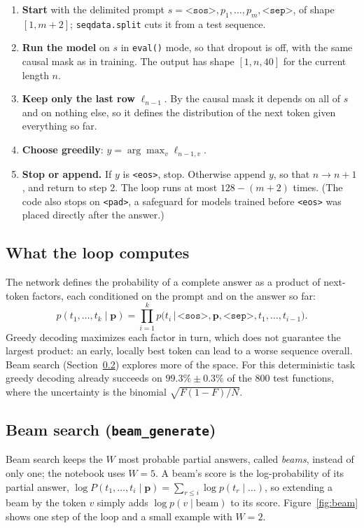 \documentclass[11pt]{article}
\newcommand{\tok}[1]{\texttt{<#1>}}
\newcommand{\code}[1]{\texttt{#1}}
\begin{document}
\begin{enumerate}
\item \textbf{Start} with the delimited prompt $s=\tok{sos},p_1,\dots,p_m,\tok{sep}$, of
  shape $[1,m+2]$; \code{seqdata.split} cuts it from a test sequence.
\item \textbf{Run the model} on $s$ in \code{eval()} mode, so that dropout is off, with
  the same causal mask as in training. The output has shape $[1,n,40]$ for the current
  length $n$.
\item \textbf{Keep only the last row} $\ell_{n-1}$. By the causal mask it depends on all
  of $s$ and on nothing else, so it defines the distribution of the next token given
  everything so far.
\item \textbf{Choose greedily}: $y=\arg\max_v\ell_{n-1,v}$.
\item \textbf{Stop or append.} If $y$ is \tok{eos}, stop. Otherwise append $y$, so that
  $n\to n+1$, and return to step 2. The loop runs at most $128-(m+2)$ times. (The code
  also stops on \tok{pad}, a safeguard for models trained before \tok{eos} was placed
  directly after the answer.)
\end{enumerate}

\subsection{What the loop computes}

The network defines the probability of a complete answer as a product of next-token
factors, each conditioned on the prompt and on the answer so far:
\begin{equation}
  p(t_1,\dots,t_k\mid\bm{p})=\prod_{i=1}^{k}
  p\big(t_i\,\big|\,\tok{sos},\bm{p},\tok{sep},t_1,\dots,t_{i-1}\big).
\end{equation}
Greedy decoding maximizes each factor in turn, which does not guarantee the largest
product: an early, locally best token can lead to a worse sequence overall. Beam search
(Section~\ref{sec:beam}) explores more of the space. For this deterministic task greedy
decoding already succeeds on $99.3\%\pm0.3\%$ of the 800 test functions, where the
uncertainty is the binomial $\sqrt{F(1-F)/N}$.

\subsection{Beam search (\code{beam\_generate})}
\label{sec:beam}

Beam search keeps the $W$ most probable partial answers, called \emph{beams}, instead of
only one; the notebook uses $W=5$. A beam's score is the log-probability of its partial
answer, $\log P(t_1,\dots,t_i\mid\bm{p})=\sum_{r\le i}\log p(t_r\mid\dots)$, so extending a
beam by the token $v$ simply adds $\log p(v\mid\text{beam})$ to its score.
Figure~\ref{fig:beam} shows one step of the loop and a small example with $W=2$.
\end{document}
